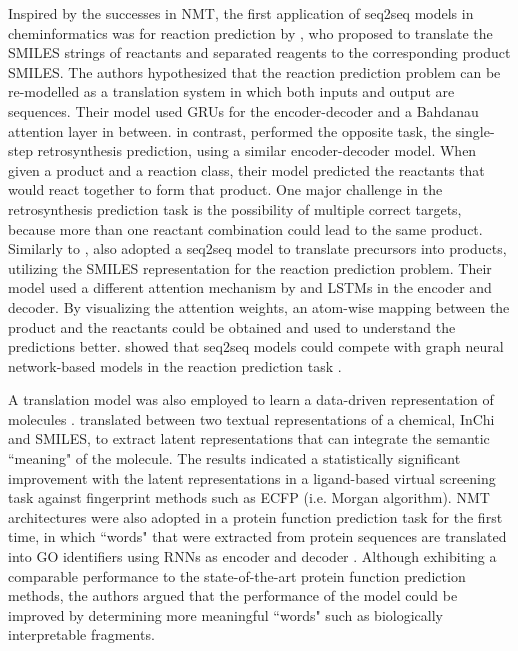 \documentclass[review]{elsarticle}
\begin{document}
Inspired by the successes in NMT, the first application of seq2seq models in cheminformatics was for reaction prediction by  \citet{nam2016linking}, who proposed to translate the SMILES strings of reactants and separated reagents to the corresponding product SMILES. The authors hypothesized that the reaction prediction problem can be re-modelled as a translation system in which both inputs and output are sequences.  Their model used GRUs for the encoder-decoder and a Bahdanau \cite{bahdanau2014neural} attention layer in between. \citet{liu2017retrosynthetic} in contrast, performed the opposite task, the single-step retrosynthesis prediction, using a similar encoder-decoder model. When given a product and a reaction class, their model predicted the reactants that would react together to form that product. One major challenge in the retrosynthesis prediction task is the possibility of multiple correct targets, because more than one reactant combination could lead to the same product. Similarly to \citet{nam2016linking}, \citet{schwaller2018found} also adopted a seq2seq model to translate precursors into products, utilizing the SMILES representation for the reaction prediction problem. Their model used a different attention mechanism by \citet{luong2015effective}  and LSTMs in the encoder and decoder. By visualizing the attention weights, an atom-wise mapping between the product and the reactants could be obtained and used to understand the predictions better. \citet{schwaller2018found} showed that seq2seq models could compete with graph neural network-based models in the reaction prediction task \cite{jin2017predicting}. 

A translation model was also employed to learn a data-driven representation of molecules \cite{winter2019learning}. \citet{winter2019learning} translated between two textual representations of a chemical, InChi and SMILES, to extract latent representations that can integrate the semantic ``meaning" of the molecule.  The results indicated a statistically significant improvement with the latent representations in a ligand-based virtual screening task against fingerprint methods such as ECFP (i.e. Morgan algorithm). NMT architectures were also adopted in a protein function prediction task for the first time, in which ``words" that were extracted from protein sequences are translated into GO identifiers using RNNs as encoder and decoder \cite{cao2017prolango}. Although exhibiting a comparable performance to the state-of-the-art protein function prediction methods, the authors argued that the performance of the model could be improved by determining more meaningful ``words" such as biologically interpretable fragments. 
\end{document}
